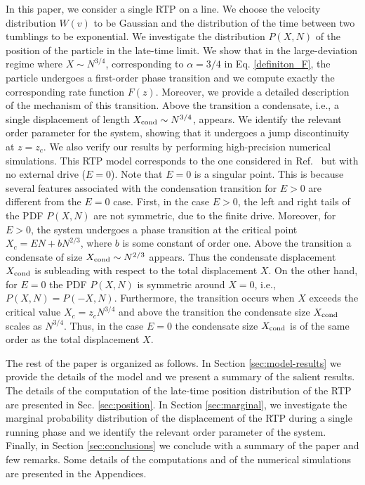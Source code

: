 \documentclass[aps,pre,twocolumn,superscriptaddress,showpacs]{revtex4-1}
\begin{document}
In this paper, we consider a single RTP on a line. We choose the velocity distribution $W(v)$ to be Gaussian and the distribution of the time between two tumblings to be exponential. We investigate the
distribution $P(X,N)$ of the position of the particle in the late-time
limit. We show that in the large-deviation regime where $X\sim
N^{3/4}$, corresponding to $\alpha=3/4$ in Eq. \eqref{definiton_F}, the particle undergoes a first-order phase transition and we
compute exactly the corresponding rate function $F(z)$. Moreover, we
provide a detailed description of the mechanism of this transition. Above the transition a condensate, i.e., a single displacement of length $X_{\rm cond}\sim N^{3/4}$, appears. We
identify the relevant order parameter for the system, showing that it
undergoes a jump discontinuity at $z=z_c$. We also verify our
results by performing high-precision numerical simulations. This RTP
model corresponds to the one considered in Ref.~\cite{GM19} but with
no external drive ($E=0$). Note that $E=0$ is a singular point. This is because several features associated with the condensation transition for $E>0$ \cite{GM19} are different from the $E=0$ case. First, in the case $E>0$, the left and right tails of the PDF $P(X,N)$ are not symmetric, due to the finite drive. Moreover, for $E>0$, the system undergoes a phase transition at the critical point $X_c=EN+bN^{2/3}$, where $b$ is some constant of order one. Above the transition a condensate of size $X_{\rm cond}\sim N^{2/3}$ appears. Thus the condensate displacement $X_{\rm cond}$ is subleading with respect to the total displacement $X$. On the other hand, for $E=0$ the PDF $P(X,N)$ is symmetric around $X=0$, i.e., $P(X,N)=P(-X,N)$. Furthermore, the transition occurs when $X$ exceeds the critical value $X_c=z_c N^{3/4}$ and above the transition the condensate size $X_{\rm cond}$ scales as $N^{3/4}$. Thus, in the case $E=0$ the condensate size $X_{\rm cond}$ is of the same order as the total displacement $X$.


The rest of the paper is organized as follows. In Section
\ref{sec:model-results} we provide the details of the model and we
present a summary of the salient results. The details of the
computation of the late-time position distribution of the RTP are
presented in Sec. \ref{sec:position}. In Section \ref{sec:marginal},
we investigate the marginal probability distribution of the
displacement of the RTP during a single running phase and we identify
the relevant order parameter of the system. Finally, in Section
\ref{sec:conclusions} we conclude with a summary of the paper and few
remarks. Some details of the computations and of the numerical simulations are presented in the
Appendices.
\end{document}
